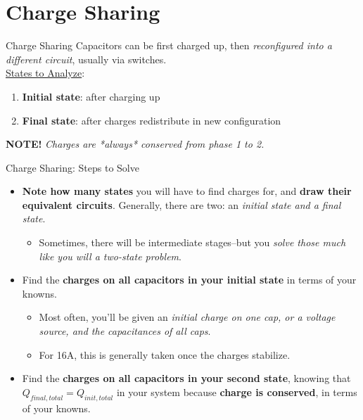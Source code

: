 \section{Charge Sharing}

\begin{frame}{Charge Sharing}
    Capacitors can be first charged up, then \textit{reconfigured into a different circuit}, usually via switches. \\[5pt]
    \underline{States to Analyze}:
    \begin{enumerate}
        \item \textbf{Initial state}: after charging up
        \item \textbf{Final state}: after charges redistribute in new configuration
    \end{enumerate}

    \textbf{NOTE!} \textit{Charges are *always* conserved from phase 1 to 2.}
\end{frame}

\begin{frame}{Charge Sharing: Steps to Solve}
    \begin{itemize}
        \item\textbf{ Note how many states} you will have to find charges for, and \textbf{draw their equivalent circuits}. Generally, there are two: an \textit{initial state and a final state}. 
        \begin{itemize}
            \item Sometimes, there will be intermediate stages--but you \textit{solve those much like you will a two-state problem}.
        \end{itemize}
        \item Find the \textbf{charges on all capacitors in your initial state} in terms of your knowns.
        \begin{itemize}
            \item Most often, you’ll be given an \textit{initial charge on one cap, or a voltage source, and the capacitances of all caps}. 
            \item For 16A, this is generally taken once the charges stabilize.
        \end{itemize}
        \item Find the \textbf{charges on all capacitors in your second state}, knowing that $Q_{final, total} = Q_{init, total}$ in your system because \textbf{charge is conserved}, in terms of your knowns.
    \end{itemize}
\end{frame}

